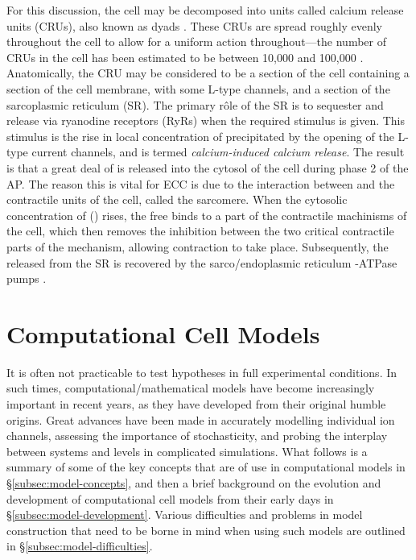 \documentclass[../thesis-main.tex]{subfiles}
\begin{document}
 For this discussion, the cell may be decomposed into units called calcium release units (CRUs), also known as dyads \citep{Cleemann1998}. These CRUs are spread roughly evenly throughout the cell to allow for a uniform action throughout---the number of CRUs in the cell has been estimated to be between 10,000 and 100,000 \citep{Cleemann1998,Greenstein2002}. Anatomically, the CRU may be considered to be a section of the cell containing a section of the cell membrane, with some L-type \ca{} channels, and a section of the sarcoplasmic reticulum (SR). The primary r\^ole of the SR is to sequester and release \ca{} via ryanodine receptors (RyRs) when the required stimulus is given. This stimulus is the rise in local concentration of \ca{} precipitated by the opening of the L-type \ca{} current channels, and is termed \emph{calcium-induced calcium release}. The result is that a great deal of \ca{} is released into the cytosol of the cell during phase 2 of the AP. The reason this is vital for ECC is due to the interaction between \ca{} and the contractile units of the cell, called the sarcomere. When the cytosolic concentration of \ca{} (\cai{}) rises, the free \ca{} binds to a part of the contractile machinisms of the cell, which then removes the inhibition between the two critical contractile parts of the mechanism, allowing contraction to take place. Subsequently, the \ca{} released from the SR is recovered by the sarco/endoplasmic reticulum \ca{}-ATPase pumps \citep{Franzini-Armstrong2005}.
 
 \section{Computational Cell Models}
 \label{sec:cell-models}
 It is often not practicable to test hypotheses in full experimental conditions. In such times, computational/mathematical models have become increasingly important in recent years, as they have developed from their original humble origins. Great advances have been made in accurately modelling individual ion channels, assessing the importance of stochasticity, and probing the interplay between systems and levels in complicated simulations. What follows is a summary of some of the key concepts that are of use in computational models in \S\ref{subsec:model-concepts}, and then a brief background on the evolution and development of computational cell models from their early days in \S\ref{subsec:model-development}. Various difficulties and problems in model construction that need to be borne in mind when using such models are outlined in \S\ref{subsec:model-difficulties}.
 
\end{document}
